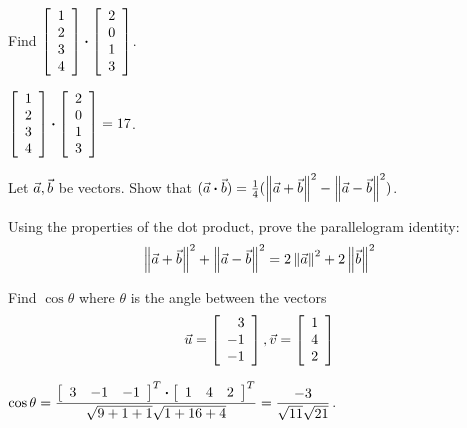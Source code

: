 \documentclass{ximera}
\author{Zack Reed}
\begin{document}
\begin{example}
    Find $\startmat{r}
      1 \\
      2 \\
      3 \\
      4
    \stopmat \dotprod \startmat{r}
      2 \\
      0 \\
      1 \\
      3
    \stopmat$.
    \begin{solution}
      $\startmat{r}
        1 \\
        2 \\
        3 \\
        4
      \stopmat \dotprod \startmat{r}
        2 \\
        0 \\
        1 \\
        3
      \stopmat = 17$.
    \end{solution}
  \end{example}
  
  \begin{example}
    Let $\vect{a},\vect{b}$ be vectors. Show that
    $(\vect{a}\dotprod \vect{b})
    = \frac{1}{4}(\norm{\vect{a}+\vect{b}}^2
    - \norm{\vect{a}-\vect{b}}^2)$.
  \end{example}
  
  \begin{example}
    Using the properties of the dot product, prove the parallelogram
    identity:
    \begin{equation*}
      \norm{\vect{a}+\vect{b}}^2+\norm{\vect{a}-\vect{b}}^2
      = 2\norm{\vect{a}}^2+2\norm{\vect{b}}^2
    \end{equation*}
  \end{example}
  
  \begin{example}
    Find $\cos \theta$ where $\theta$ is the angle between the vectors
    \begin{equation*}
      \vect{u}
      =
      \startmat{r}
        3 \\
        -1 \\
        -1
      \stopmat,
      \vect{v}
      =
      \startmat{r}
        1 \\
        4 \\
        2
      \stopmat
    \end{equation*}
    \begin{solution}
      $\displaystyle\cos\theta=\frac{\startmat{ccc}
          3 & -1 & -1
        \stopmat^T \dotprod
        \startmat{ccc}
          1 & 4 & 2
        \stopmat^T}
      {\sqrt{9+1+1}\sqrt{1+16+4}}= \frac{-3}{\sqrt{11}\sqrt{21}}$.
    \end{solution}
  \end{example}
  
\end{document}
